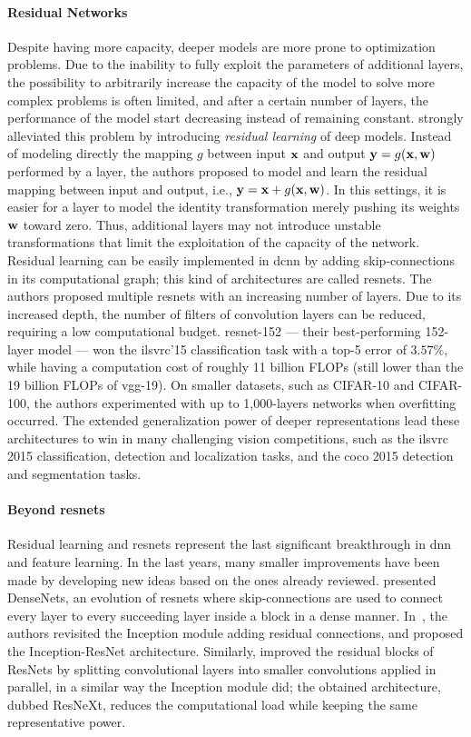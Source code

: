 \paragraph{Residual Networks}
Despite having more capacity, deeper models are more prone to optimization problems.
Due to the inability to fully exploit the parameters of additional layers, the possibility to arbitrarily increase the capacity of the model to solve more complex problems is often limited, and after a certain number of layers, the performance of the model start decreasing instead of remaining constant.
\citet{he2016deep} strongly alleviated this problem by introducing \emph{residual learning} of deep models.
Instead of modeling directly the mapping $g$ between input $\mathbf{x}$ and output $\mathbf{y} = g(\mathbf{x}, \mathbf{w})$ performed by a layer, the authors proposed to model and learn the residual mapping between input and output, i.e., $\mathbf{y} = \mathbf{x} + g(\mathbf{x}, \mathbf{w})$.
In this settings, it is easier for a layer to model the identity transformation merely pushing its weights $\mathbf{w}$ toward zero.
Thus, additional layers may not introduce unstable transformations that limit the exploitation of the capacity of the network.
Residual learning can be easily implemented in \gls{dcnn} by adding skip-connections in its computational graph;
this kind of architectures are called \glspl{resnet}.
The authors proposed multiple \glspl{resnet} with an increasing number of layers.
Due to its increased depth, the number of filters of convolution layers can be reduced, requiring a low computational budget.
\gls{resnet}-152 --- their best-performing 152-layer model --- won the \gls{ilsvrc}'15 classification task with a top-5 error of $3.57 \%$, while having a computation cost of roughly 11 billion FLOPs (still lower than the 19 billion FLOPs of \gls{vgg}-19).
On smaller datasets, such as CIFAR-10 and CIFAR-100, the authors experimented with up to 1,000-layers networks when overfitting occurred.
The extended generalization power of deeper representations lead these architectures to win in many challenging vision competitions, such as the \gls{ilsvrc} 2015 classification, detection and localization tasks, and the \acrshort{coco} 2015 detection and segmentation tasks.

\paragraph{Beyond \glspl{resnet}}
Residual learning and \glspl{resnet} represent the last significant breakthrough in \gls{dnn} and feature learning.
In the last years, many smaller improvements have been made by developing new ideas based on the ones already reviewed.
\citet{huang2017densely} presented DenseNets, an evolution of \glspl{resnet} where skip-connections are used to connect every layer to every succeeding layer inside a block in a dense manner.
In~\cite{szegedy2017inception}, the authors revisited the Inception module adding residual connections, and proposed the Inception-ResNet architecture.
Similarly, \citet{xie2017aggregated} improved the residual blocks of \glspl{ResNet} by splitting convolutional layers into smaller convolutions applied in parallel, in a similar way the Inception module did;
the obtained architecture, dubbed ResNeXt, reduces the computational load while keeping the same representative power.

